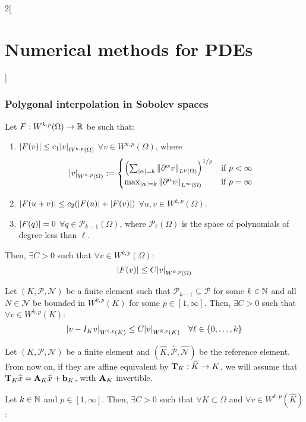 \documentclass[../../../main_math.tex]{subfiles}
\begin{document}
\begin{multicols}{2}[\section{Numerical methods for PDEs}]
  \subsubsection{Polygonal interpolation in Sobolev spaces}
  \begin{lemma}
    Let $F:W^{k,p}(\Omega)\to\mathbb{R}$ be such that:
    \begin{enumerate}
      \item $\abs{F(v)}\leq c_1\abs{v}_{W^{k,p}(\Omega)}$ $\forall v\in W^{k,p}(\Omega)$, where $$
              \abs{v}_{W^{k,p}(\Omega)}:=
              \begin{cases}
                {\left({\sum_{\abs{\alpha}= k}\left\|\partial^\alpha v\right\|_{L^p(\Omega)}}\right)}^{1/p} & \text{if }p<\infty \\
                \max_{\abs{\alpha}= k}\left\|\partial^\alpha v\right\|_{L^\infty(\Omega)}                   & \text{if }p=\infty
              \end{cases}
            $$
      \item $\abs{F(u+v)}\leq c_2(\abs{F(u)}+\abs{F(v)})$ $\forall u,v\in W^{k,p}(\Omega)$.
      \item $\abs{F(q)}=0$ $\forall q\in\mathcal{P}_{k-1}(\Omega)$, where $\mathcal{P}_{\ell}(\Omega)$ is the space of polynomials of degree less than $\ell$.
    \end{enumerate}
    Then, $\exists C>0$ such that $\forall v\in W^{k,p}(\Omega)$:
    $$
      \abs{F(v)}\leq C\abs{v}_{W^{k,p}(\Omega)}
    $$
  \end{lemma}
  \begin{theorem}
    Let $(K,\mathcal{P},\mathcal{N})$ be a finite element such that $\mathcal{P}_{k-1}\subseteq \mathcal{P}$ for some $k\in\mathbb{N}$ and all $N\in\mathcal{N}$ be bounded in $W^{k,p}(K)$ for some $p\in[1,\infty]$. Then, $\exists C>0$ such that $\forall v\in W^{k,p}(K)$:
    $$
      \abs{v-I_Kv}_{W^{\ell,p}(K)}\leq C\abs{v}_{W^{k,p}(K)} \quad\forall \ell\in\{0,\ldots,k\}
    $$
  \end{theorem}
  \begin{remark}
    Let $(K,\mathcal{P},\mathcal{N})$ be a finite element and $(\widehat{K}, \widehat{\mathcal{P}}, \widehat{\mathcal{N}})$ be the reference element. From now on, if they are affine equivalent by $\boldsymbol{\mathrm{T}}_K:\widehat{K}\to K$, we will assume that $\boldsymbol{\mathrm{T}}_K\widehat{x}=\boldsymbol{\mathrm{A}}_K \widehat{x}+\boldsymbol{\mathrm{b}}_K$, with $\boldsymbol{\mathrm{A}}_K$ invertible.
  \end{remark}
  \begin{lemma}
    Let $k\in \mathbb{N}$ and $p\in[1,\infty]$. Then, $\exists C>0$ such that $\forall K\subset\Omega$ and $\forall v\in W^{k,p}(\widehat{K})$:

\end{lemma}
\end{multicols}
\end{document}

